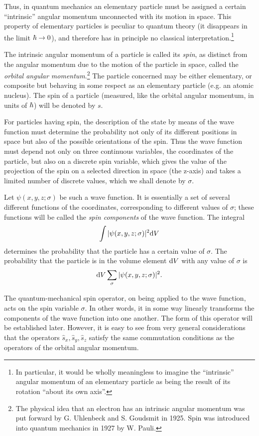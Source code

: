 Thus, in quantum mechanics an elementary particle must be assigned a certain “intrinsic” angular momentum unconnected with its motion in space. This property of elementary particles is peculiar to quantum theory (it disappears in the limit $ \hbar\to 0 $), and therefore has in principle no classical interpretation.\footnote{In particular, it would be wholly meaningless to imagine the “intrinsic” angular momentum of an elementary particle as being the result of its rotation “about its own axis”.
}

The intrinsic angular momentum of a particle is called its \textit{spin}, as distinct from the angular momentum due to the motion of the particle in space, called the \textit{orbital angular momentum}.\footnote{The physical idea that an electron has an intrinsic angular momentum was put forward by G. Uhlenbeck and S. Goudsmit in 1925. Spin was introduced into quantum mechanics in 1927 by W. Pauli.
} The particle concerned may be either elementary, or composite but behaving in some respect as an elementary particle (e.g. an atomic nucleus). The spin of a particle (measured, like the orbital angular momentum, in units of $ \hbar $) will be denoted by $ s $.

For particles having spin, the description of the state by means of the wave function must determine the probability not only of its different positions in space but also of the possible orientations of the spin. Thus the wave function must depend not only on three continuous variables, the coordinates of the particle, but also on a discrete spin variable, which gives the value of the projection of the spin on a selected direction in space (the z-axis) and takes a limited number of discrete values, which we shall denote by $\sigma$.

Let $ \psi(x, y, z; \sigma) $ be such a wave function. It is essentially a set of several different functions of the coordinates, corresponding to different values of $\sigma$; these functions will be called the \textit{spin components} of the wave function. The integral
\[ \int|\psi(x,y,z;\sigma)|^2\mathrm{d} V \]
determines the probability that the particle has a certain value of $\sigma$. The probability that the particle is in the volume element $ \mathrm{d} V $ with any value of $\sigma$ is
\[ \mathrm{d} V\sum_{\sigma}|\psi(x,y,z;\sigma)|^2. \]



The quantum-mechanical spin operator, on being applied to the wave function, acts on the spin variable $\sigma$. In other words, it in some way linearly transforms the components of the wave function into one another. The form of this operator will be established later. However, it is easy to see from very general considerations that the operators $\hat{s}_x,\hat{s}_y,\hat{s}_z$ satisfy the same commutation conditions as the operators of the orbital angular momentum.

